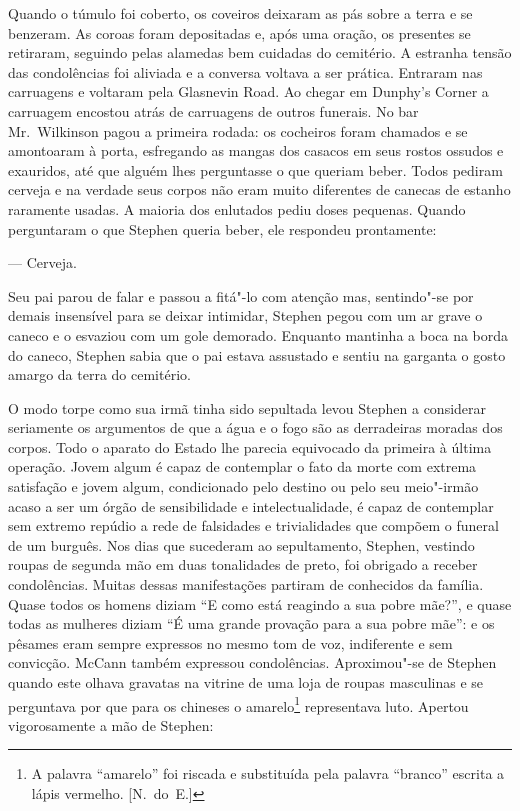 Quando o túmulo foi coberto, os coveiros deixaram as pás sobre a terra e se
benzeram.  As coroas foram depositadas e, após uma oração, os presentes se
retiraram, seguindo pelas alamedas bem cuidadas do cemitério.  A estranha
tensão das condolências foi aliviada e a conversa voltava a ser prática.
Entraram nas carruagens e voltaram pela Glasnevin Road.  Ao chegar em Dunphy’s
Corner a carruagem encostou atrás de carruagens de outros funerais.  No bar 
Mr.~Wilkinson pagou a primeira rodada: os cocheiros foram chamados e se amontoaram
à porta, esfregando as mangas dos casacos em seus rostos ossudos e exauridos,
até que alguém lhes perguntasse o que queriam beber.  Todos pediram cerveja e
na verdade seus corpos não eram muito diferentes de canecas de estanho
raramente usadas.  A maioria dos enlutados pediu doses pequenas.  Quando
perguntaram o que Stephen queria beber, ele respondeu prontamente:

--- Cerveja.

Seu pai parou de falar e passou a fitá"-lo com atenção mas, sentindo"-se por
demais insensível para se deixar intimidar, Stephen pegou com um ar grave o
caneco e o esvaziou com um gole demorado.  Enquanto mantinha a boca na borda do
caneco, Stephen sabia que o pai estava assustado e sentiu na garganta o gosto
amargo da terra do cemitério.  

O modo torpe como sua irmã tinha sido sepultada levou Stephen a considerar
seriamente os argumentos de que a água e o fogo são as derradeiras moradas dos
corpos.  Todo o aparato do Estado lhe parecia equivocado da primeira à última
operação.  Jovem algum é capaz de contemplar o fato da morte com extrema
satisfação e jovem algum, condicionado pelo destino ou pelo seu meio"-irmão
acaso a ser um órgão de sensibilidade e intelectualidade, é capaz de contemplar
sem extremo repúdio a rede de falsidades e trivialidades que compõem o funeral
de um burguês.  Nos dias que sucederam ao sepultamento, Stephen, vestindo
roupas de segunda mão em \label{duas"-tonalidades} duas tonalidades de preto, foi obrigado a receber
condolências.  Muitas dessas manifestações partiram de conhecidos da família.
Quase todos os homens diziam “E como está reagindo a sua pobre mãe?”, e quase
todas as mulheres diziam “É uma grande provação para a sua pobre mãe”: e os
pêsames eram sempre expressos no mesmo tom de voz, indiferente e sem convicção.
McCann também expressou condolências.  Aproximou"-se de Stephen quando este
olhava gravatas na vitrine de uma loja de roupas masculinas e se perguntava por
que para os chineses o amarelo\footnote{ A palavra “amarelo” foi riscada e substituída
pela palavra “branco” escrita a lápis vermelho. [N.~do~E.]} representava luto.  Apertou
vigorosamente a mão de Stephen:

